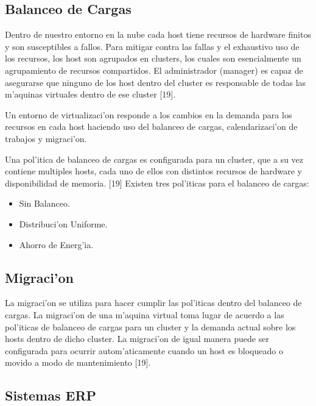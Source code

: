 \subsection*{Balanceo de Cargas}

Dentro de nuestro entorno en la nube cada host tiene recursos de hardware finitos y son susceptibles a fallos. Para mitigar contra las fallas y el exhaustivo uso de los recursos, los host son agrupados en clusters, los cuales son esencialmente un agrupamiento de recursos compartidos. El administrador (manager) es capaz de asegurarse que ninguno de los host dentro del cluster es responsable de todas las m'aquinas virtuales dentro de ese cluster [19].

Un entorno de virtualizaci'on responde a los cambios en la demanda para los recursos en cada host haciendo uso del balanceo de cargas, calendarizaci'on de trabajos y migraci'on.

Una pol'itica de balanceo de cargas es configurada para un cluster, que a su vez contiene multiples hosts, cada uno de ellos con distintos recursos de hardware y disponibilidad de memoria. [19]
Existen tres pol'iticas para el balanceo de cargas:
\begin{itemize}
\item Sin Balanceo.
\item Distribuci'on Uniforme.
\item Ahorro de Energ'ia.
\end{itemize}

\subsection*{Migraci'on}

La migraci'on se utiliza para hacer cumplir las pol'iticas dentro del balanceo de cargas. La migraci'on de una m'aquina virtual toma lugar de acuerdo a las pol'iticas de balanceo de cargas para un cluster y la demanda actual sobre los hosts dentro de dicho cluster. La migraci'on de igual manera puede ser configurada para ocurrir autom'aticamente cuando un host es bloqueado o movido a modo de mantenimiento [19]. 

\subsection*{Sistemas ERP}


